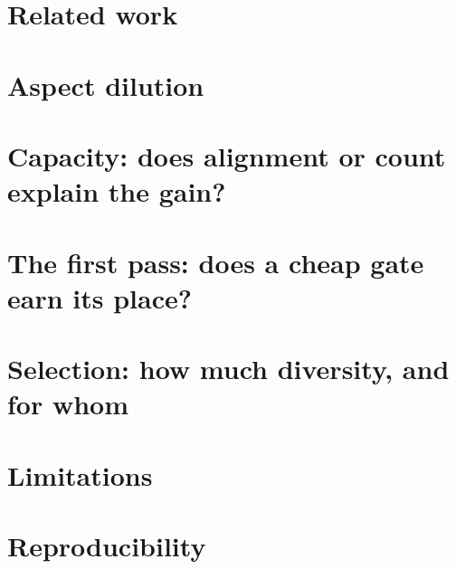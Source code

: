 \documentclass[runningheads]{llncs}
\begin{document}
\section{Related work}
\label{sec:related}


\section{Aspect dilution}
\label{sec:dilution}



\section{Capacity: does alignment or count explain the gain?}
\label{sec:limit}



\section{The first pass: does a cheap gate earn its place?}
\label{sec:gate}



\section{Selection: how much diversity, and for whom}
\label{sec:diversity}



\section{Limitations}
\label{sec:limitations}



\section{Reproducibility}
\label{sec:repro}





\end{document}
